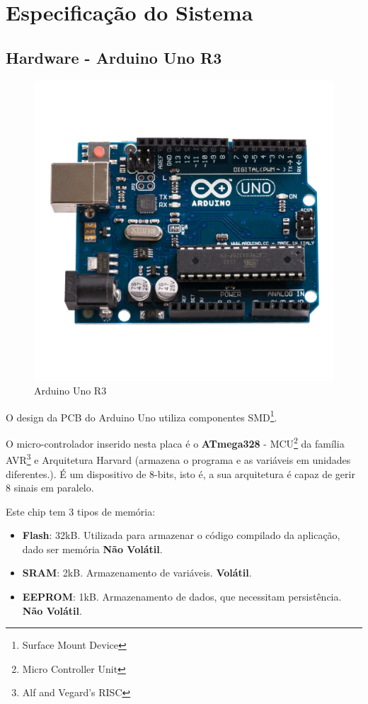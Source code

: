\chapter{Especificação do Sistema}

\section{Hardware - Arduino Uno R3}
\begin{figure}[H]
    \centering
    \includegraphics[scale=0.15]{images/Arduino_Board.jpg}
    \caption{Arduino Uno R3}
\end{figure}
O design da PCB do Arduino Uno utiliza componentes SMD\footnote{Surface Mount Device}.

O micro-controlador inserido nesta placa é o \textbf{ATmega328} - MCU\footnote{Micro Controller Unit} da família AVR\footnote{Alf and Vegard's RISC} e Arquitetura Harvard (armazena o programa e as variáveis em unidades diferentes.). É um dispositivo de 8-bits, isto é, a sua arquitetura é capaz de gerir 8 sinais em paralelo.

Este chip tem 3 tipos de memória:
\begin{itemize}
    \item \textbf{Flash}: 32kB. Utilizada para armazenar o código compilado da aplicação, dado ser memória \textbf{Não Volátil}.
    \item \textbf{SRAM}: 2kB. Armazenamento de variáveis. \textbf{Volátil}.
    \item \textbf{EEPROM}: 1kB. Armazenamento de dados, que necessitam persistência. \textbf{Não Volátil}.
\end{itemize}

